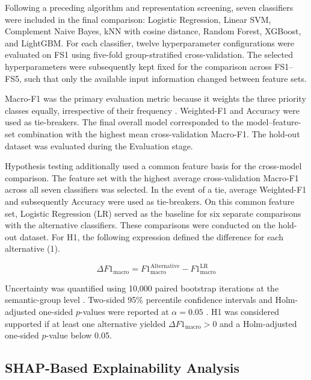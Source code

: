 Following a preceding algorithm and representation screening, seven classifiers were included in the final comparison: Logistic Regression, Linear SVM, Complement Naive Bayes, kNN with cosine distance, Random Forest, XGBoost, and LightGBM. For each classifier, twelve hyperparameter configurations were evaluated on FS1 using five-fold group-stratified cross-validation. The selected hyperparameters were subsequently kept fixed for the comparison across FS1--FS5, such that only the available input information changed between feature sets.

Macro-F1 was the primary evaluation metric because it weights the three priority classes equally, irrespective of their frequency \cite{sokolova2009systematic}. Weighted-F1 and Accuracy were used as tie-breakers. The final overall model corresponded to the model–feature-set combination with the highest mean cross-validation Macro-F1. The hold-out dataset was evaluated during the Evaluation stage.

Hypothesis testing additionally used a common feature basis for the cross-model comparison. The feature set with the highest average cross-validation Macro-F1 across all seven classifiers was selected. In the event of a tie, average Weighted-F1 and subsequently Accuracy were used as tie-breakers. On this common feature set, Logistic Regression (LR) served as the baseline for six separate comparisons with the alternative classifiers. These comparisons were conducted on the hold-out dataset. For H1, the following expression defined the difference for each alternative (1).

\begin{equation}
\Delta F1_{\mathrm{macro}}
=
F1_{\mathrm{macro}}^{\mathrm{Alternative}}
-
F1_{\mathrm{macro}}^{\mathrm{LR}}
\label{eq:h1_delta}
\end{equation}

Uncertainty was quantified using 10,000 paired bootstrap iterations at the semantic-group level \cite{efron1979bootstrap}. Two-sided 95\% percentile confidence intervals and Holm-adjusted one-sided $p$-values were reported at $\alpha = 0.05$ \cite{holm1979simple}. H1 was considered supported if at least one alternative yielded $\Delta F1_{\mathrm{macro}} > 0$ and a Holm-adjusted one-sided $p$-value below 0.05.

\subsection{SHAP-Based Explainability Analysis}

